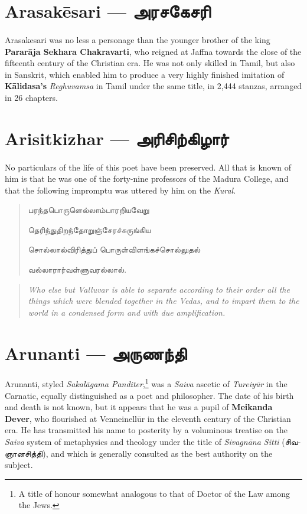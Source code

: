 \documentclass{article}
\newcommand{\TamilText}[1]{\texttamil{#1}}
\newcommand{\TamilBold}[1]{\texttamil{\textbf{#1}}}
\newcommand{\tam}[1]{\TamilText{#1}}
\newcommand{\tambold}[1]{\TamilBold{#1}}
\begin{document}
\section{Arasak\={e}sari --- \tambold{அரசகேசரி}}
\paragraph{}
Arasakesari was no less a personage than the younger brother of the king \textbf{Parar\={a}ja Sekhara Chakravarti}, who reigned at Jaffna towards the close of the fifteenth century of the Christian era. He was not only skilled in Tamil, but also in Sanskrit, which enabled him to produce a very highly finished imitation of \textbf{K\={a}lidasa's} \emph{Reghuvamsa} in Tamil under the same title, in 2,444 stanzas, arranged in 26 chapters.

\section{Arisitkizhar --- \tambold{அரிசிற்கிழார்}}
\paragraph{}
No particulars of the life of this poet have been preserved. All that is known of him is that he was one of the forty-nine professors of the Madura College, and that the following impromptu was uttered by him on the \emph{Kural}.
\begin{quotation}\small
\tam{பரந்தபொருளெல்லாம்பாரறியவேறு}

\tam{தெரிந்துதிறந்தோறுஞ்சேரச்சுருங்கிய}

\tam{சொல்லால்விரித்துப்‌ பொருள்விளங்கச்சொல்லுதல்‌}

\tam{வல்லாரார்வள்ளுவரல்லால்}.
\end{quotation}
\begin{quotation}\small
\emph{Who else but Valluvar is able to separate according to their order all the things which were blended together in the Vedas, and to impart them to the world in a condensed form and with due amplification.}
\end{quotation}
\section{Arunanti --- \tambold{அருணந்தி}}
\paragraph{}
Arunanti, styled \emph{Sakal\={a}gama Panditer},\footnote{A title of honour somewhat analogous to that of Doctor of the Law among the Jews.} was a \emph{Saiva} ascetic of \emph{Tureiy\={u}r} in the Carnatic, equally distinguished as a poet and philosopher. The date of his birth and death is not known, but it appears that he was a pupil of \textbf{Meikanda Dever}, who flourished at Venneinell\={u}r in the eleventh century of the Christian era. He has transmitted his name to posterity by a voluminous treatise on the \emph{Saiva} system of metaphysics and theology under the title of \emph{Sivagn\={a}na Sitti} (\tam{சிவஞானசித்தி}), and which is generally consulted as the best authority on the subject.
\end{document}
